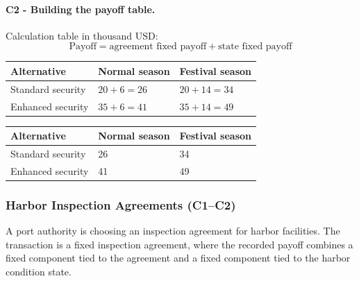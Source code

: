 
	\paragraph*{C2 - Building the payoff table.}
	\label{subsec:problem24-warehouse-security-agreements-c2}
	Calculation table in thousand USD:
	\[
	\text{Payoff}=\text{agreement fixed payoff}+\text{state fixed payoff}
	\]
	\begin{center}
		\begin{tabular}{lll}
			\toprule
			Alternative & Normal season & Festival season \\
			\midrule
			Standard security & $20 + 6 = 26$ & $20 + 14 = 34$ \\
			Enhanced security & $35 + 6 = 41$ & $35 + 14 = 49$ \\
			\bottomrule
		\end{tabular}
	\end{center}

	\begin{center}
		\begin{tabular}{lll}
			\toprule
			Alternative & Normal season & Festival season \\
			\midrule
			Standard security & 26 & 34 \\
			Enhanced security & 41 & 49 \\
			\bottomrule
		\end{tabular}
	\end{center}


	\subsubsection{Harbor Inspection Agreements (C1--C2)}
	\label{sec:problem25-harbor-inspection-agreements-c1-c2}
	A port authority is choosing an inspection agreement for harbor facilities. The transaction is a fixed inspection agreement, where the recorded payoff combines a fixed component tied to the agreement and a fixed component tied to the harbor condition state.

